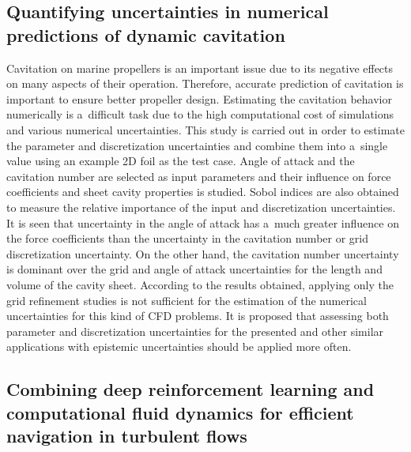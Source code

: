 \documentclass[a4paper,10pt]{article}
\begin{document}
\subsection{Quantifying uncertainties in numerical predictions of dynamic cavitation \cite{kara_quantifying_2023}}

Cavitation on marine propellers is an important issue due to its negative effects on many aspects of their operation. Therefore, accurate prediction of cavitation is important to ensure better propeller design. Estimating the cavitation behavior numerically is a~difficult task due to the high computational cost of simulations and various numerical uncertainties. This study is carried out in order to estimate the parameter and discretization uncertainties and combine them into a~single value using an example 2D foil as the test case. Angle of attack and the cavitation number are selected as input parameters and their influence on force coefficients and sheet cavity properties is studied. Sobol indices are also obtained to measure the relative importance of the input and discretization uncertainties. It is seen that uncertainty in the angle of attack has a~much greater influence on the force coefficients than the uncertainty in the cavitation number or grid discretization uncertainty. On the other hand, the cavitation number uncertainty is dominant over the grid and angle of attack uncertainties for the length and volume of the cavity sheet. According to the results obtained, applying only the grid refinement studies is not sufficient for the estimation of the numerical uncertainties for this kind of CFD problems. It is proposed that assessing both parameter and discretization uncertainties for the presented and other similar applications with epistemic uncertainties should be applied more often.

\subsection{Combining deep reinforcement learning and computational fluid dynamics for efficient navigation in turbulent flows \cite{lidtke_combining_2023}}
\end{document}
